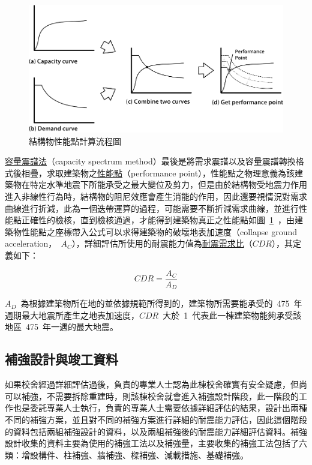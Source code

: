 \begin{figure}[hbtp]
  \begin{center}
    \includegraphics[width=1.0\textwidth]{figures/performance-point.png}
    \caption{結構物性能點計算流程圖}
    \label{fig:performance-point}
  \end{center}
\end{figure}

\underline{容量震譜法}（capacity spectrum method）最後是將需求震譜以及容量震譜轉換格式後相疊，求取建築物之\underline{性能點}（performance point），性能點之物理意義為該建築物在特定水準地震下所能承受之最大變位及剪力，但是由於結構物受地震力作用進入非線性行為時，結構物的阻尼效應會產生消能的作用，因此還要視情況對需求曲線進行折減，此為一個迭帶運算的過程，可能需要不斷折減需求曲線，並進行性能點正確性的檢核，直到檢核通過，才能得到建築物真正之性能點如圖~\ref{fig:performance-point}~，由建築物性能點之座標帶入公式可以求得建築物的破壞地表加速度（collapse ground acceleration，~$A_C$），詳細評估所使用的耐震能力值為\underline{耐震需求比}（$CDR$），其定義如下：

\begin{equation} CDR = \dfrac{A_C}{A_D} \label{eq:CDR}\end{equation} 

$A_D$~為根據建築物所在地的並依據規範所得到的，建築物所需要能承受的~475~年週期最大地震所產生之地表加速度，$CDR$~大於~1~代表此一棟建築物能夠承受該地區~475~年一遇的最大地震。

\subsection{補強設計與竣工資料}

如果校舍經過詳細評估過後，負責的專業人士認為此棟校舍確實有安全疑慮，但尚可以補強，不需要拆除重建時，則該棟校舍就會進入補強設計階段，此一階段的工作也是委託專業人士執行，負責的專業人士需要依據詳細評估的結果，設計出兩種不同的補強方案，並且對不同的補強方案進行詳細的耐震能力評估，因此這個階段的資料包括兩組補強設計的資料，以及兩組補強後的耐震能力詳細評估資料。補強設計收集的資料主要為使用的補強工法以及補強量，主要收集的補強工法包括了六類：增設構件、柱補強、牆補強、樑補強、減載措施、基礎補強。

